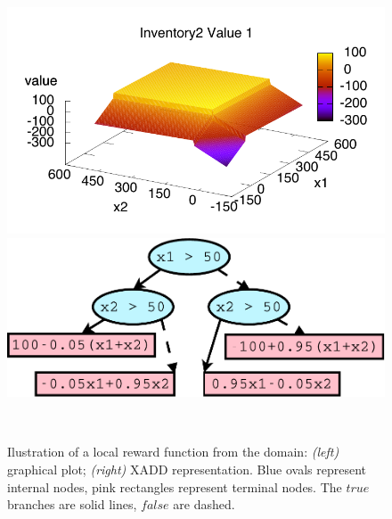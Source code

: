 \begin{figure}[t!]
\hspace{-5mm}
\begin{minipage}{0.25\textwidth}
\center
\includegraphics[width=\textwidth, height=0.75\textwidth]{figures/XADDExample/inventory2Value1.pdf} 
\end{minipage}
\hspace{-2mm}
\begin{minipage}{0.25\textwidth}
\center
\includegraphics[width=\textwidth, height=0.65\textwidth]{figures/XADDExample/inventory2V1DD.pdf}
\end{minipage}\vspace{-3mm}\\
\caption{\footnotesize Ilustration of a local reward function from the \Invent domain: \emph{(left)} graphical plot; \emph{(right)} XADD representation. Blue ovals represent internal nodes, pink rectangles represent terminal nodes. The $true$ branches are solid lines, $false$ are dashed.}
\label{fig:exampleDD}
\vspace{-6mm}
\end{figure}
\vspace{1mm}
